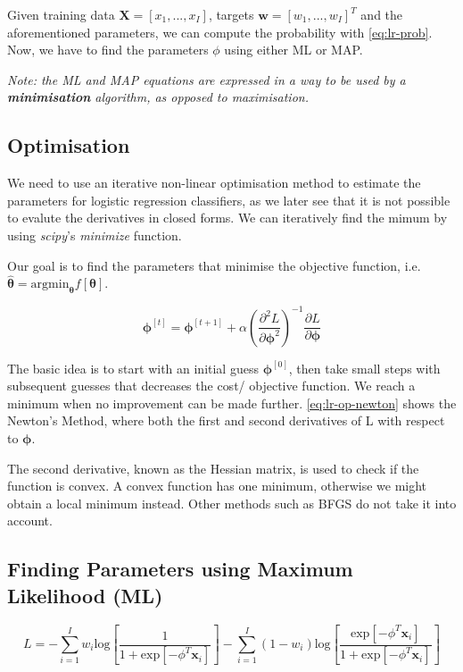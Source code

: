 \documentclass[11pt,openright,a4paper]{article}
\numberwithin{equation}{section}
\begin{document}
Given training data $\mathbf{X} = [x_1, ..., x_I]$, targets $\mathbf{w} = [w_1, ..., w_I]^T$ and the aforementioned parameters, we can compute the probability with \autoref{eq:lr-prob}. Now, we have to find the parameters $\phi$ using either ML or MAP.

\textit{Note: the ML and MAP equations are expressed in a way to be used by a \textbf{minimisation} algorithm, as opposed to maximisation.}

\subsection{Optimisation} \label{ssec:lr-op}
We need to use an iterative non-linear optimisation method to estimate the parameters for logistic regression classifiers, as we later see that it is not possible to evalute the derivatives in closed forms. We can iteratively find the mimum by using \textit{scipy}'s \textit{minimize} function.

Our goal is to find the parameters that minimise the objective function, i.e. $\hat{\boldsymbol\theta} = \text{argmin}_{\boldsymbol{\theta}} f[\boldsymbol\theta]$. 

\begin{equation} \label{eq:lr-op-newton}
    \boldsymbol\phi^{[t]} = \boldsymbol\phi^{[t+1]} + 
    \alpha \left ( \frac{\partial^2 L}{\partial \boldsymbol{\phi}^2} \right )^{-1}
    \frac{\partial L}{\partial \boldsymbol\phi}
\end{equation}

The basic idea is to start with an initial guess $\boldsymbol\phi^{[0]}$, then take small steps with subsequent guesses that decreases the cost/ objective function. We reach a minimum when no improvement can be made further. \autoref{eq:lr-op-newton} shows the Newton's Method, where both the first and second derivatives of L with respect to $\boldsymbol\phi$. 

The second derivative, known as the Hessian matrix, is used to check if the function is convex. A convex function has one minimum, otherwise we might obtain a local minimum instead. Other methods such as BFGS do not take it into account.


\subsection{Finding Parameters using Maximum Likelihood (ML)} \label{ssec:lr-ml}

\begin{equation} \label{eq:lr-ml-L}
    L = -\sum_{i=1}^{I} w_i \text{log} 
            \left [ \frac{1}
                         {1 + \text{exp} \left [ -\phi^{T} \mathbf{x}_i \right ]} \right ]
        -
        \sum_{i=1}^{I} \left (1-w_i \right ) \text{log} 
            \left [ \frac{\text{exp} \left [ -\phi^{T} \mathbf{x}_i \right ]}
                         {1 + \text{exp} \left [ -\phi^{T} \mathbf{x}_i \right ]} 
            \right ]
\end{equation}
\end{document}
